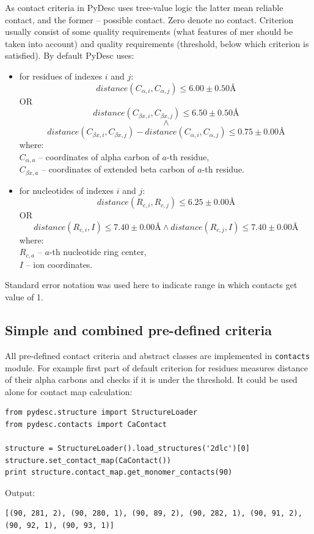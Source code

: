 \documentclass{article}
\begin{document}
As contact criteria in PyDesc uses tree-value logic the latter mean reliable contact, and the former -- possible contact. Zero denote no contact. Criterion usually consist of some quality requirements (what features of mer should be taken into account) and quality requirements (threshold, below which criterion is satisfied). By default PyDesc uses:
\begin{itemize}
    \item for residues of indexes $i$ and $j$:
    $$distance(C_{\alpha{}, i}, C_{\alpha{}, j}) \leq 6.00 \pm 0.50 \textrm{\AA}$$
    OR
    $$distance(C_{\beta{}x, i}, C_{\beta{}x, j}) \leq 6.50 \pm 0.50 \textrm{\AA}$$
    $$\land$$
    $$distance(C_{\beta{}x, i}, C_{\beta{}x, j}) - distance(C_{\alpha{}, i}, C_{\alpha{}, j}) \leq 0.75 \pm 0.00 \textrm{\AA}$$
    where:\\
    $C_{\alpha{}, a}$ -- coordinates of alpha carbon of $a$-th residue,\\
    $C_{\beta{}x, a}$ -- coordinates of extended beta carbon of $a$-th residue.
    \item for nucleotides of indexes $i$ and $j$:
    $$distance(R_{c, i}, R_{c, j}) \leq 6.25 \pm 0.00 \textrm{\AA}$$
    OR
    $$distance(R_{c, i}, I) \leq 7.40 \pm 0.00 \textrm{\AA} \land{} distance(R_{c, j}, I) \leq 7.40 \pm 0.00 \textrm{\AA}$$
    where:\\
    $R_{c, a}$ -- $a$-th nucleotide ring center,\\
    $I$ -- ion coordinates.
\end{itemize}

Standard error notation was used here to indicate range in which contacts get value of 1.

%
%
\subsection{Simple and combined pre-defined criteria}

All pre-defined contact criteria and abstract classes are implemented in \texttt{contacts} module. For example first part of default criterion for residues measures distance of their alpha carbons and checks if it is under the threshold. It could be used alone for contact map calculation:

\begin{lstlisting}
from pydesc.structure import StructureLoader
from pydesc.contacts import CaContact

structure = StructureLoader().load_structures('2dlc')[0]
structure.set_contact_map(CaContact())
print structure.contact_map.get_monomer_contacts(90)
\end{lstlisting}
Output:
\begin{lstlisting}
[(90, 281, 2), (90, 280, 1), (90, 89, 2), (90, 282, 1), (90, 91, 2), (90, 92, 1), (90, 93, 1)]
\end{lstlisting}
\end{document}
